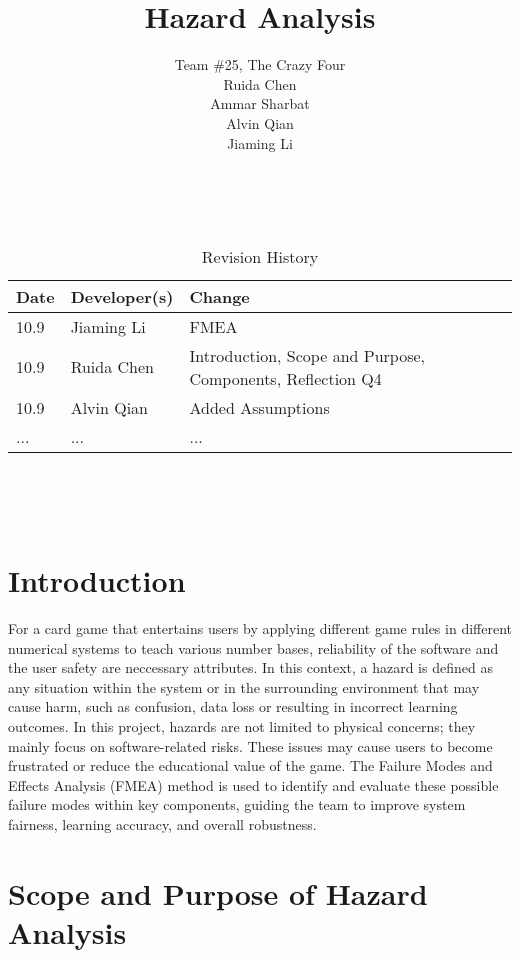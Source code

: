 \documentclass{article}
\title{Hazard Analysis\\\progname}
\author{
    Team \#25, The Crazy Four \\[1ex]
    Ruida Chen \\
    Ammar Sharbat \\
    Alvin Qian \\
    Jiaming Li
}
\date{}
\begin{document}
\maketitle
\thispagestyle{empty}

~\newpage


\begin{table}[hp]
\caption{Revision History} \label{TblRevisionHistory}
\begin{tabularx}{\textwidth}{llX}
\toprule
\textbf{Date} & \textbf{Developer(s)} & \textbf{Change}\\
\midrule
10.9 & Jiaming Li & FMEA\\
10.9 & Ruida Chen & Introduction, Scope and Purpose, Components, Reflection Q4\\
10.9 & Alvin Qian & Added Assumptions\\
... & ... & ...\\
\bottomrule
\end{tabularx}
\end{table}

~\newpage

\tableofcontents

~\newpage



\section{Introduction}

For a card game that entertains users by applying different game rules in different numerical systems to teach various number bases, reliability of the software and the user safety are neccessary attributes. In this context, a hazard is defined as any situation within the system or in the surrounding environment that may cause harm, such as confusion, data loss or resulting in incorrect learning outcomes. In this project, hazards are not limited to physical concerns; they mainly focus on software-related risks. These issues may cause users to become frustrated or reduce the educational value of the game. The Failure Modes and Effects Analysis (FMEA) method is used to identify and evaluate these possible failure modes within key components, guiding the team to improve system fairness, learning accuracy, and overall robustness.

\section{Scope and Purpose of Hazard Analysis}
\end{document}
